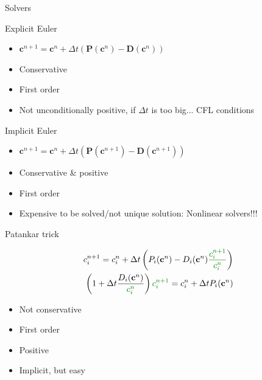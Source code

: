 \documentclass[9pt,compress,t,aspectratio=169]{beamer}
\newcommand{\1}{\begin{pmatrix}
                 1\\
                 1
                \end{pmatrix}}
\def\bc{\mathbf{c}}
\def\bP{\mathbf{P}}
\def\bD{\mathbf{D}}
\begin{document}
\begin{frame}{Solvers}
	\begin{minipage}{0.45\textwidth}
\begin{block}{Explicit Euler}
\begin{itemize}
\item $\bc^{n+1}= \bc^n +\Delta t \left( \bP(\bc^n) -\bD(\bc^n) \right)$
\item Conservative 
\item First order
\item Not unconditionally positive, if $\Delta t$ is too big... CFL conditions
\end{itemize}
\end{block}
	\end{minipage} \hfill
\begin{minipage}{0.49\textwidth}
\begin{block}{Implicit Euler}
\begin{itemize}
	\item $
	\bc^{n+1}= \bc^n +\Delta t \left( \bP(\bc^{n+1}) -\bD(\bc^{n+1})\right)
	$
	\item Conservative \& positive
	\item First order
	\item Expensive to be solved/not unique solution: Nonlinear solvers!!!
\end{itemize}
\end{block}
\end{minipage}
\begin{block}{Patankar trick}
	\begin{minipage}{0.48\textwidth}
\vspace*{-2mm}\begin{equation*}
\begin{split}
c_i^{n+1}= c_i^n +\Delta t \left( P_i(\bc^{n}) -D_i(\bc^{n}){\color{lightgreen}\frac{c_i^{n+1}}{c_i^n}}\right) \\
\left( 1+\Delta t \frac{D_i(\bc^n)}{\color{lightgreen}c_i^n} \right){\color{lightgreen} c_i^{n+1}} = c^n_i +\Delta t P_i(\bc^{n}) 
\end{split}
\end{equation*}
	\end{minipage}\hfill
\begin{minipage}{0.45\textwidth}
\begin{itemize}
	\item Not conservative
	\item First order
	\item Positive
	\item Implicit, but easy
\end{itemize}
\end{minipage}
\end{block}

\end{frame}
\end{document}
